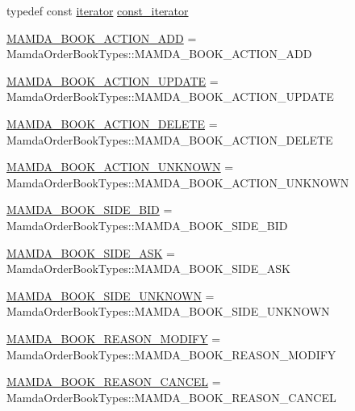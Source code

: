 \begin{CompactItemize}
\item 
typedef const \hyperlink{classWombat_1_1MamdaOrderBookPriceLevel_1_1iterator}{iterator} \hyperlink{classWombat_1_1MamdaOrderBookPriceLevel_21b49530b6966927c9f5e84b184834a0}{const\_\-iterator}
\item 
\hyperlink{classWombat_1_1MamdaOrderBookPriceLevel_bd3407b4250fc6f7a42d94b6d32e358a4e7c79b2e4388868a7de8569234dfc1b}{MAMDA\_\-BOOK\_\-ACTION\_\-ADD} = Mamda\-Order\-Book\-Types::MAMDA\_\-BOOK\_\-ACTION\_\-ADD
\item 
\hyperlink{classWombat_1_1MamdaOrderBookPriceLevel_bd3407b4250fc6f7a42d94b6d32e358a9b00aebdabd4b5a0d0ed36b86778f5f2}{MAMDA\_\-BOOK\_\-ACTION\_\-UPDATE} = Mamda\-Order\-Book\-Types::MAMDA\_\-BOOK\_\-ACTION\_\-UPDATE
\item 
\hyperlink{classWombat_1_1MamdaOrderBookPriceLevel_bd3407b4250fc6f7a42d94b6d32e358a8952762a05dabfc494c818260f0e91bc}{MAMDA\_\-BOOK\_\-ACTION\_\-DELETE} = Mamda\-Order\-Book\-Types::MAMDA\_\-BOOK\_\-ACTION\_\-DELETE
\item 
\hyperlink{classWombat_1_1MamdaOrderBookPriceLevel_bd3407b4250fc6f7a42d94b6d32e358a830091d42d6e0cfc4fb0e115f530b93a}{MAMDA\_\-BOOK\_\-ACTION\_\-UNKNOWN} = Mamda\-Order\-Book\-Types::MAMDA\_\-BOOK\_\-ACTION\_\-UNKNOWN
\item 
\hyperlink{classWombat_1_1MamdaOrderBookPriceLevel_384c34b0a74d874b8969dee9b0d3718d36006736894184b2ba382d5035ff588a}{MAMDA\_\-BOOK\_\-SIDE\_\-BID} = Mamda\-Order\-Book\-Types::MAMDA\_\-BOOK\_\-SIDE\_\-BID
\item 
\hyperlink{classWombat_1_1MamdaOrderBookPriceLevel_384c34b0a74d874b8969dee9b0d3718d1f849c81b23e8305763bb4171c7fdda1}{MAMDA\_\-BOOK\_\-SIDE\_\-ASK} = Mamda\-Order\-Book\-Types::MAMDA\_\-BOOK\_\-SIDE\_\-ASK
\item 
\hyperlink{classWombat_1_1MamdaOrderBookPriceLevel_384c34b0a74d874b8969dee9b0d3718d383262f728a83e872ceeea39a7ddec3e}{MAMDA\_\-BOOK\_\-SIDE\_\-UNKNOWN} = Mamda\-Order\-Book\-Types::MAMDA\_\-BOOK\_\-SIDE\_\-UNKNOWN
\item 
\hyperlink{classWombat_1_1MamdaOrderBookPriceLevel_cef40c91570e45ff2313cfe91c42910fae81a622baef0ffa76bf3ada9ec41e23}{MAMDA\_\-BOOK\_\-REASON\_\-MODIFY} = Mamda\-Order\-Book\-Types::MAMDA\_\-BOOK\_\-REASON\_\-MODIFY
\item 
\hyperlink{classWombat_1_1MamdaOrderBookPriceLevel_cef40c91570e45ff2313cfe91c42910f56ea2dee55a9b51874e0d9f35144ca8a}{MAMDA\_\-BOOK\_\-REASON\_\-CANCEL} = Mamda\-Order\-Book\-Types::MAMDA\_\-BOOK\_\-REASON\_\-CANCEL

\end{CompactItemize}
